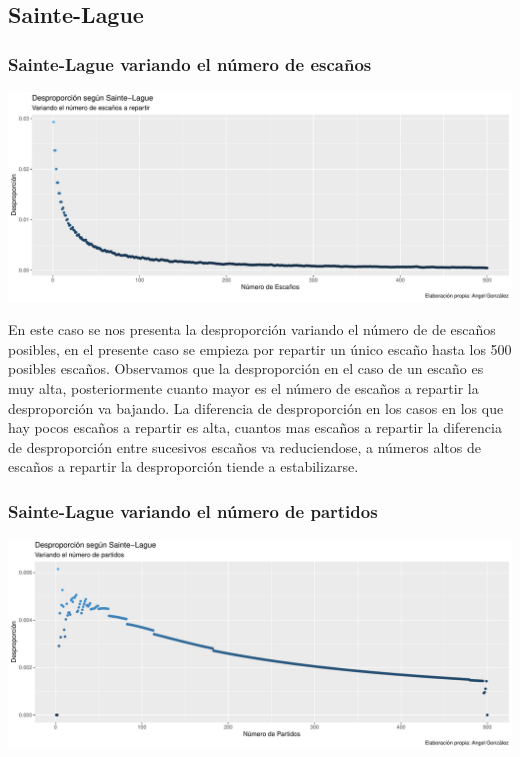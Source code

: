 \documentclass[12pt,a4paper,]{book}
\numberwithin{dummy}{section}
\theoremstyle{ocrenumbox}
\theoremstyle{blacknumex}
\theoremstyle{blacknumbox}
\theoremstyle{ocrenum}
\theoremstyle{ocrenum}
\begin{document}
\hypertarget{sainte-lague}{%
\subsection{Sainte-Lague}\label{sainte-lague}}

\hypertarget{sainte-lague-variando-el-nuxfamero-de-escauxf1os}{%
\subsubsection{Sainte-Lague variando el número de
escaños}\label{sainte-lague-variando-el-nuxfamero-de-escauxf1os}}

\begin{center}\includegraphics[width=0.95\linewidth]{figurasR/unnamed-chunk-14-1} \end{center}

En este caso se nos presenta la desproporción variando el número de de
escaños posibles, en el presente caso se empieza por repartir un único
escaño hasta los 500 posibles escaños. Observamos que la desproporción
en el caso de un escaño es muy alta, posteriormente cuanto mayor es el
número de escaños a repartir la desproporción va bajando. La diferencia
de desproporción en los casos en los que hay pocos escaños a repartir es
alta, cuantos mas escaños a repartir la diferencia de desproporción
entre sucesivos escaños va reduciendose, a números altos de escaños a
repartir la desproporción tiende a estabilizarse.

\hypertarget{sainte-lague-variando-el-nuxfamero-de-partidos}{%
\subsubsection{Sainte-Lague variando el número de
partidos}\label{sainte-lague-variando-el-nuxfamero-de-partidos}}

\begin{center}\includegraphics[width=0.95\linewidth]{figurasR/unnamed-chunk-15-1} \end{center}
\end{document}
